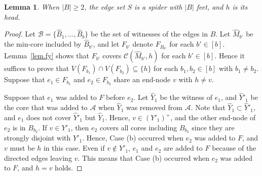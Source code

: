 \documentclass[11pt]{article}
\newtheorem{lemma}{Lemma}
\newcommand{\Afam}{\mathcal{A}}
\newcommand{\Cfam}{\mathcal{C}}
\newcommand{\Bfam}{\mathcal{B}}
\begin{document}
 \begin{lemma}\label{lem.spider2}
 When $|B|\geq 2$,
  the edge set $S$
  is a spider with $|B|$ feet, and $h$ is its head.
\end{lemma}
\begin{proof}
 Let $\Bfam=\{\hat{B}_1,\ldots,\hat{B}_b\}$ be the set of witnesses of
 the edges in $B$.
 Let $\hat{M}_{b'}$ be the min-core included by $\hat{B}_{b'}$,
 and let $F_{b'}$ denote $F_{B_{b'}}$
 for each $b' \in [b]$.
 Lemma~\ref{lem.fy} shows that $F_{b'}$ covers $\Cfam(\hat{M}_{b'},h)$
 for each $b' \in [b]$.
 Hence it suffices to prove that 
 $V(F_{b_1}) \cap V(F_{b_2}) \subseteq \{h\}$ for each
 $b_1,b_2\in [b]$ with $b_1 \neq b_2$.
 Suppose that $e_1 \in F_{b_1}$ and $e_2 \in F_{b_2}$ share an
 end-node $v$ with $h\neq v$.
 
 Suppose that $e_1$ was added to $F$
 before $e_2$.
 Let $\hat{Y}_1$
 be the witness of $e_1$, and $\hat{Y}'_1$ be the core 
 that was added to $\Afam$ when $\hat{Y}_1$ was removed from $\Afam$.
 Note that $\hat{Y}_1 \subset \hat{Y}'_1$, and
 $e_1$ does not cover $\hat{Y}'_1$ but $\hat{Y}_1$.
 Hence, $v \in (Y'_1)^+$,
 and the other end-node of $e_2$ is in $B_{b_2}$.
 If $v \in Y'_1$, then
 $e_2$ covers all cores including $B_{b_2}$
 since they are strongly disjoint with $Y'_1$.
 Hence, Case (b) occurred when $e_2$ was added to $F$, 
 and $v$ must be $h$ in this case.
 Even if $v \not\in Y'_1$, 
 $e_1$ and $e_2$ are added to $F$ because of the directed edges leaving $v$.
 This means that
 Case (b) occurred when $e_2$ was added to $F$,
 and $h=v$ holds.
\end{proof}
\end{document}
